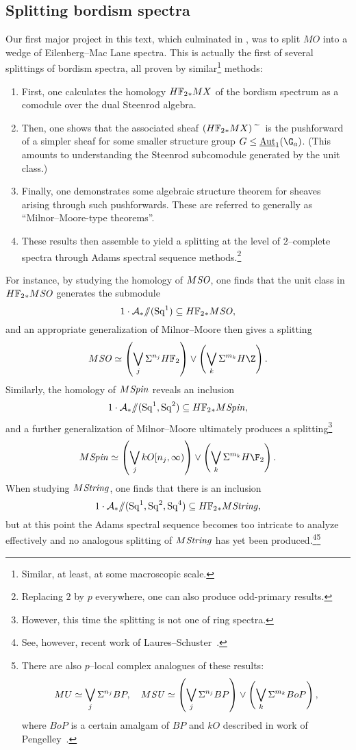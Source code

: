 \subsection*{Splitting bordism spectra}

Our first major project in this text, which culminated in , was to split \(MO\) into a wedge of Eilenberg--Mac Lane spectra.  This is actually the first of several splittings of bordism spectra, all proven by similar\footnote{Similar, at least, at some macroscopic scale.} methods:
\begin{enumerate}
    \item First, one calculates the homology \(\HFtwo_* MX\) of the bordism spectrum as a comodule over the dual Steenrod algebra.
    \item Then, one shows that the associated sheaf \((\HFtwo_* MX)\widetilde{\quad}\) is the pushforward of a simpler sheaf for some smaller structure group \(G \le \InternalAut_1(\G_a)\).  (This amounts to understanding the Steenrod subcomodule generated by the unit class.)
    \item Finally, one demonstrates some algebraic structure theorem for sheaves arising through such pushforwards.  These are referred to generally as ``Milnor--Moore-type theorems''.
    \item These results then assemble to yield a splitting at the level of \(2\)--complete spectra through Adams spectral sequence methods.\footnote{Replacing \(2\) by \(p\) everywhere, one can also produce odd-primary results.}
\end{enumerate}

For instance, by studying the homology of \(M\mathit{SO}\), one finds that the unit class in \(\HFtwo_* M\SO\) generates the submodule~\cite[Lemma 20.38]{Switzer} \[1 \cdot \mathcal A_* \mmod (\Sq^1) \subseteq \HFtwo_* M\SO,\] and an appropriate generalization of Milnor--Moore then gives a splitting \[M\SO \simeq \left( \bigvee_j \Susp^{n_j} \HFtwo \right) \vee \left( \bigvee_k \Susp^{m_k} H\Z \right).\]  Similarly, the homology of \(M\mathit{Spin}\) reveals an inclusion~\cite{ABS,ABP,GiambalvoPengelley} \[1 \cdot \mathcal A_* \mmod (\Sq^1, \Sq^2) \subseteq \HFtwo_* M\Spin,\] and a further generalization of Milnor--Moore ultimately produces a splitting\footnote{However, this time the splitting is not one of ring spectra.} \[M\Spin \simeq \left( \bigvee_j kO[n_j, \infty)\right) \vee \left( \bigvee_k \Susp^{m_k} H\F_2 \right).\]  When studying \(M\mathit{String}\), one finds that there is an inclusion \[1 \cdot \mathcal A_* \mmod (\Sq^1, \Sq^2, \Sq^4) \subseteq \HFtwo_* M\String,\] but at this point the Adams spectral sequence becomes too intricate to analyze effectively and no analogous splitting of \(M\mathit{String}\) has yet been produced.\footnote{See, however, recent work of Laures--Schuster~\cite[Section 2]{LauresSchuster}.}\footnote{There are also \(p\)--local complex analogues of these results:
\[
MU \simeq \bigvee_j \Sigma^{n_j} BP, \quad
M\mathit{SU} \simeq \left(\bigvee_j \Sigma^{n_j} BP\right) \vee \left(\bigvee_k \Sigma^{m_k} BoP \right),
\]
where \(BoP\) is a certain amalgam of \(BP\) and \(kO\) described in work of Pengelley~\cite{Pengelley}.}

